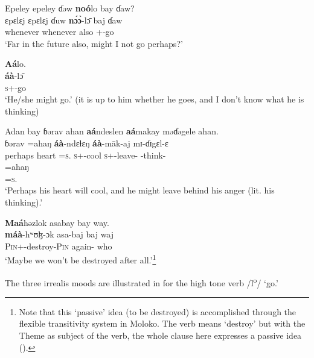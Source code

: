 \ea\label{ex:7:71}
Epeley  epeley  ɗəw  \textbf{noó}lo  bay  ɗaw?\\
\gll  ɛpɛlɛj  ɛpɛlɛj    ɗuw    \textbf{n\'ɔ\`ɔ}-l\=ɔ    baj  ɗaw\\
      whenever  whenever  also    {\oneS}+{\PBL}-go  {\NEG}  {\QUEST}\\
\glt  ‘Far in the future also, might I not go perhaps?’\\
\z 

\ea\label{ex:7:72}
\textbf{Aá}lo.\\
\gll  \textbf{áà}-l\=ɔ\\
      \textsc{s}+{\PBL}-go\\
\glt  ‘He/she might go.’ (it is up to him whether he goes, and I don’t know what he is thinking)\\
\z 

\ea\label{ex:7:73}
Adan  bay  ɓərav  ahan  \textbf{aá}ndeslen  \textbf{aá}makay  məɗəgele  ahan.\\
  ɓərav  =ahaŋ    \textbf{áà}-ndɛɬɛŋ  \textbf{áà}-m\={a}k-aj    mɪ-ɗɪgɛl-ɛ\\  
      perhaps  heart  =\textsc{s}.{\POSS}  \textsc{s}+{\PBL}{}-cool  \textsc{s}+{\PBL}{}-leave{}-{\CL} {\NOM}{}-think-{\CL}\\  
      
\medskip
\gll =ahaŋ\\
     =\textsc{s}.{\POSS}\\
\glt  ‘Perhaps his heart will cool, and he might leave behind his anger (lit. his thinking).’\\
\z 

\ea\label{ex:7:74}
\textbf{Maá}həzlok  asabay  bay  way.\\
\gll  \textbf{máà}-hʷʊɮ{}-ɔk      asa-baj    baj  waj\\
      \textsc{Pin}+{\PBL}{}-destroy-\textsc{Pin}  again-{\NEG}  {\NEG}  who\\
\glt  ‘Maybe we won’t be destroyed after all.’\footnote{Note that this ‘passive’ idea (to be destroyed) is accomplished through the flexible transitivity system in Moloko. The verb means ‘destroy’ but with the Theme as subject of the verb, the whole clause here expresses a passive idea (). }\\
\z  

The three irrealis moods are illustrated in  for the high tone verb /l\textsuperscript{o}/ ‘go.’

